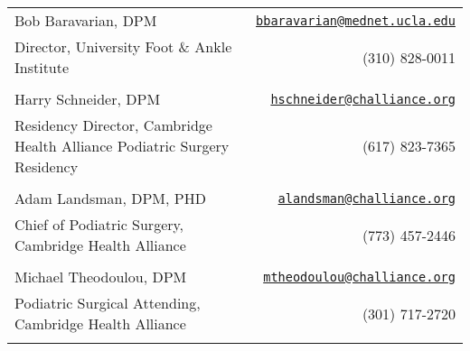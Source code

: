\documentclass[letterpaper,10pt]{article}
\newcommand{\len}{7in}
\begin{document}
\begin{tabular*}{\len}{@{\extracolsep{\fill}}lr}
    \\
    Bob Baravarian, DPM & \href{mailto: bbaravarian@mednet.ucla.edu}{\texttt{bbaravarian@mednet.ucla.edu}} \\
    Director, University Foot \& Ankle Institute & (310) 828-0011 \\
    \\
    Harry Schneider, DPM & \href{mailto: hschneider@challiance.org}{\texttt{hschneider@challiance.org}} \\
    Residency Director, Cambridge Health Alliance Podiatric Surgery Residency & (617) 823-7365 \\
    \\
    Adam Landsman, DPM, PHD & \href{mailto: alandsman@challiance.org}{\texttt{alandsman@challiance.org}} \\
    Chief of Podiatric Surgery, Cambridge Health Alliance & (773) 457-2446 \\
    \\
    Michael Theodoulou, DPM & \href{mailto: mtheodoulou@challiance.org}{\texttt{mtheodoulou@challiance.org}} \\
    Podiatric Surgical Attending, Cambridge Health Alliance & (301) 717-2720 \\
    \\
\end{tabular*}
\end{document}
